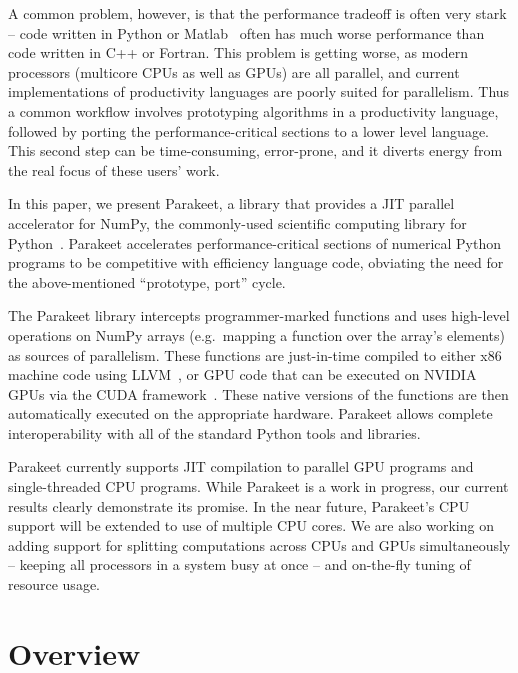 \documentclass[10pt,twocolumn]{article}
\begin{document}
A common problem, however, is that the performance tradeoff is often very stark -- code written in Python or Matlab~\cite{Moler80} often has much worse performance than code written in C++ or Fortran.  This problem is getting worse, as modern processors (multicore CPUs as well as GPUs) are all parallel, and current implementations of productivity languages are poorly suited for parallelism.  Thus a common workflow involves prototyping algorithms in a productivity language, followed by porting the performance-critical sections to a lower level language.  This second step can be time-consuming, error-prone, and it diverts energy from the real focus of these users' work.

In this paper, we present Parakeet, a library that provides a JIT parallel accelerator for NumPy, the commonly-used scientific computing library for Python~\cite{Oliphant07}. Parakeet accelerates performance-critical sections of numerical Python programs to be competitive with efficiency language code, obviating the need for the above-mentioned ``prototype, port'' cycle.

The Parakeet library intercepts programmer-marked functions and uses high-level operations on NumPy arrays (e.g.~mapping a function over the array's elements) as sources of parallelism. These functions are just-in-time compiled to either x86 machine code using LLVM~\cite{Latt02}, or GPU code that can be executed on NVIDIA GPUs via the CUDA framework~\cite{NvidCU}. These native versions of the functions are then automatically executed on the appropriate hardware. Parakeet allows complete interoperability with all of the standard Python tools and libraries.

Parakeet currently supports JIT compilation to parallel GPU programs and single-threaded CPU programs.  While Parakeet is a work in progress, our current results clearly demonstrate its promise.  In the near future, Parakeet's CPU support will be extended to use of multiple CPU cores.  We are also working on adding support for splitting computations across CPUs and GPUs simultaneously -- keeping all processors in a system busy at once -- and on-the-fly tuning of resource usage.

\section{Overview}
\label{overview}
\end{document}
